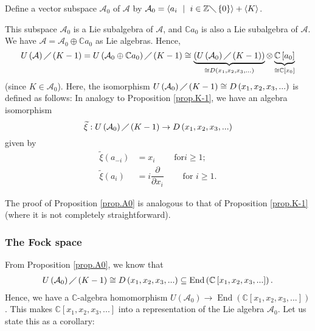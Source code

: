 \documentclass[etingof-lie.tex]{subfiles}
\begin{document}
\begin{definition}
\label{def.A0}Define a vector subspace $\mathcal{A}_{0}$ of $\mathcal{A}$ by
$\mathcal{A}_{0}=\left\langle a_{i}\ \mid\ i\in\mathbb{Z}\diagdown\left\{
0\right\}  \right\rangle +\left\langle K\right\rangle $.
\end{definition}

\begin{proposition}
\label{prop.A0}This subspace $\mathcal{A}_{0}$ is a Lie subalgebra of
$\mathcal{A}$, and $\mathbb{C}a_{0}$ is also a Lie subalgebra of $\mathcal{A}%
$. We have $\mathcal{A}=\mathcal{A}_{0}\oplus\mathbb{C}a_{0}$ as Lie algebras.
Hence,%
\[
U\left(  \mathcal{A}\right)  \diagup\left(  K-1\right)  =U\left(
\mathcal{A}_{0}\oplus\mathbb{C}a_{0}\right)  \diagup\left(  K-1\right)
\cong\underbrace{\left(  U\left(  \mathcal{A}_{0}\right)  \diagup\left(
K-1\right)  \right)  }_{\cong D\left(  x_{1},x_{2},x_{3},...\right)  }%
\otimes\underbrace{\mathbb{C}\left[  a_{0}\right]  }_{\cong\mathbb{C}\left[
x_{0}\right]  }%
\]
(since $K\in\mathcal{A}_{0}$). Here, the isomorphism $U\left(  \mathcal{A}%
_{0}\right)  \diagup\left(  K-1\right)  \cong D\left(  x_{1},x_{2}%
,x_{3},...\right)  $ is defined as follows: In analogy to Proposition
\ref{prop.K-1}, we have an algebra isomorphism%
\[
\widetilde{\xi}:U\left(  \mathcal{A}_{0}\right)  \diagup\left(  K-1\right)
\rightarrow D\left(  x_{1},x_{2},x_{3},...\right)
\]
given by%
\begin{align*}
\widetilde{\xi}\left(  a_{-i}\right)   &  =x_{i}\ \ \ \ \ \ \ \ \ \ \text{for
}i\geq1;\\
\widetilde{\xi}\left(  a_{i}\right)   &  =i\dfrac{\partial}{\partial x_{i}%
}\ \ \ \ \ \ \ \ \ \ \text{for }i\geq1.
\end{align*}

\end{proposition}

The proof of Proposition \ref{prop.A0} is analogous to that of Proposition
\ref{prop.K-1} (where it is not completely straightforward).

\subsubsection{The Fock space}

From Proposition \ref{prop.A0}, we know that
\begin{align*}
U\left(  \mathcal{A}_{0}\right)  \diagup\left(  K-1\right)  \cong D\left(
x_{1},x_{2},x_{3},...\right)  \subseteq\operatorname*{End}\left(
\mathbb{C}\left[  x_{1},x_{2},x_{3},...\right]  \right)  .
\end{align*}
Hence, we have a $\mathbb{C}$-algebra homomorphism $U\left(  \mathcal{A}%
_{0}\right)  \rightarrow\operatorname*{End}\left(  \mathbb{C}\left[
x_{1},x_{2},x_{3},...\right]  \right)  $. This makes $\mathbb{C}\left[
x_{1},x_{2},x_{3},...\right]  $ into a representation of the Lie algebra
$\mathcal{A}_{0}$. Let us state this as a corollary:
\end{document}
